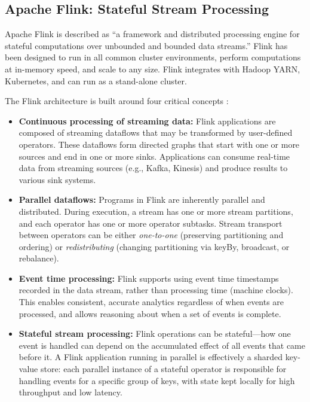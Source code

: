 \subsection{Apache Flink: Stateful Stream Processing}

Apache Flink \citep{flinkdocs2024} is described as ``a framework and distributed processing engine for stateful computations over unbounded and bounded data streams.'' Flink has been designed to run in all common cluster environments, perform computations at in-memory speed, and scale to any size. Flink integrates with Hadoop YARN, Kubernetes, and can run as a stand-alone cluster.

The Flink architecture is built around four critical concepts \citep{flinkdocs2024}:

\begin{itemize}
    \item \textbf{Continuous processing of streaming data:} Flink applications are composed of streaming dataflows that may be transformed by user-defined operators. These dataflows form directed graphs that start with one or more sources and end in one or more sinks. Applications can consume real-time data from streaming sources (e.g., Kafka, Kinesis) and produce results to various sink systems.
    \item \textbf{Parallel dataflows:} Programs in Flink are inherently parallel and distributed. During execution, a stream has one or more stream partitions, and each operator has one or more operator subtasks. Stream transport between operators can be either \textit{one-to-one} (preserving partitioning and ordering) or \textit{redistributing} (changing partitioning via keyBy, broadcast, or rebalance).
    \item \textbf{Event time processing:} Flink supports using event time timestamps recorded in the data stream, rather than processing time (machine clocks). This enables consistent, accurate analytics regardless of when events are processed, and allows reasoning about when a set of events is complete.
    \item \textbf{Stateful stream processing:} Flink operations can be stateful---how one event is handled can depend on the accumulated effect of all events that came before it. A Flink application running in parallel is effectively a sharded key-value store: each parallel instance of a stateful operator is responsible for handling events for a specific group of keys, with state kept locally for high throughput and low latency.
\end{itemize}

